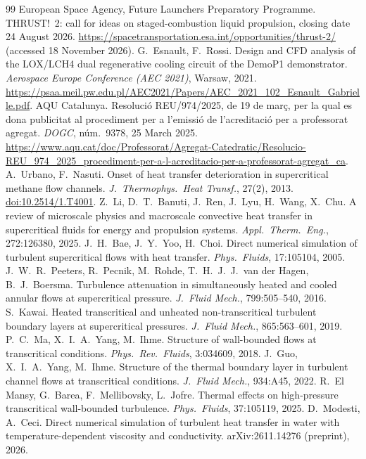\documentclass[11pt]{article}
\begin{document}
\begin{thebibliography}{99}
 European Space Agency, Future Launchers Preparatory Programme. THRUST!~2: call for ideas on staged-combustion liquid propulsion, closing date 24 August 2026. \url{https://spacetransportation.esa.int/opportunities/thrust-2/} (accessed 18 November 2026).
 G.\ Esnault, F.\ Rossi. Design and CFD analysis of the LOX/LCH4 dual regenerative cooling circuit of the DemoP1 demonstrator. \emph{Aerospace Europe Conference (AEC 2021)}, Warsaw, 2021. \url{https://psaa.meil.pw.edu.pl/AEC2021/Papers/AEC_2021_102_Esnault_Gabrielle.pdf}.
 AQU Catalunya. Resoluci\'o REU/974/2025, de 19 de mar\c{c}, per la qual es dona publicitat al procediment per a l'emissi\'o de l'acreditaci\'o per a professorat agregat. \emph{DOGC}, n\'um.~9378, 25 March 2025. \url{https://www.aqu.cat/doc/Professorat/Agregat-Catedratic/Resolucio-REU_974_2025_procediment-per-a-l-acreditacio-per-a-professorat-agregat_ca}.
 A.\ Urbano, F.\ Nasuti. Onset of heat transfer deterioration in supercritical methane flow channels. \emph{J.\ Thermophys.\ Heat Transf.}, 27(2), 2013. \href{https://doi.org/10.2514/1.T4001}{doi:10.2514/1.T4001}.
 Z.\ Li, D.\ T.\ Banuti, J.\ Ren, J.\ Lyu, H.\ Wang, X.\ Chu. A review of microscale physics and macroscale convective heat transfer in supercritical fluids for energy and propulsion systems. \emph{Appl.\ Therm.\ Eng.}, 272:126380, 2025.
 J.\ H.\ Bae, J.\ Y.\ Yoo, H.\ Choi. Direct numerical simulation of turbulent supercritical flows with heat transfer. \emph{Phys.\ Fluids}, 17:105104, 2005.
 J.\ W.\ R.\ Peeters, R.\ Pecnik, M.\ Rohde, T.\ H.\ J.\ J.\ van der Hagen, B.\ J.\ Boersma. Turbulence attenuation in simultaneously heated and cooled annular flows at supercritical pressure. \emph{J.\ Fluid Mech.}, 799:505--540, 2016.
 S.\ Kawai. Heated transcritical and unheated non-transcritical turbulent boundary layers at supercritical pressures. \emph{J.\ Fluid Mech.}, 865:563--601, 2019.
 P.\ C.\ Ma, X.\ I.\ A.\ Yang, M.\ Ihme. Structure of wall-bounded flows at transcritical conditions. \emph{Phys.\ Rev.\ Fluids}, 3:034609, 2018.
 J.\ Guo, X.\ I.\ A.\ Yang, M.\ Ihme. Structure of the thermal boundary layer in turbulent channel flows at transcritical conditions. \emph{J.\ Fluid Mech.}, 934:A45, 2022.
 R.\ El Mansy, G.\ Barea, F.\ Mellibovsky, L.\ Jofre. Thermal effects on high-pressure transcritical wall-bounded turbulence. \emph{Phys.\ Fluids}, 37:105119, 2025.
 D.\ Modesti, A.\ Ceci. Direct numerical simulation of turbulent heat transfer in water with temperature-dependent viscosity and conductivity. arXiv:2611.14276 (preprint), 2026.

\end{thebibliography}
\end{document}
